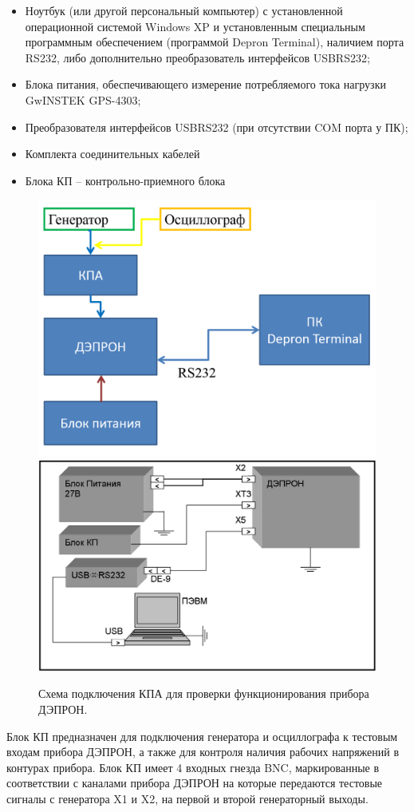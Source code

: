 \begin{itemize}
	\item 	Ноутбук (или другой персональный компьютер) с установленной операционной системой Windows XP и установленным специальным программным обеспечением (программой Depron Terminal), наличием порта RS232, либо дополнительно преобразователь интерфейсов USBRS232;
	
	
	\item 	Блока питания, обеспечивающего измерение потребляемого тока нагрузки GwINSTEK GPS-4303;
	
	
	\item 	Преобразователя интерфейсов USBRS232 (при отсутствии COM порта у ПК);
	
	
	\item 	Комплекта соединительных кабелей 
	
	
	\item 	Блока КП -- контрольно-приемного блока
	
	
\end{itemize}





\begin{figure}
	\centering
	\includegraphics[width=0.49\linewidth]{images/kalibr}
	\includegraphics[width=0.49\linewidth]{images/kalibr1}
	\caption[Схема подключения прибора при калибровке]{ Схема подключения КПА для проверки функционирования прибора ДЭПРОН.}
	\label{fig:kalibr}
\end{figure}



Блок КП предназначен для подключения генератора и осциллографа к тестовым входам прибора ДЭПРОН, а также для контроля наличия рабочих напряжений в контурах прибора. Блок КП имеет 4 входных гнезда BNC, маркированные в соответствии с каналами прибора ДЭПРОН на которые передаются тестовые сигналы с генератора X1 и	X2, на первой и второй генераторный выходы. 


